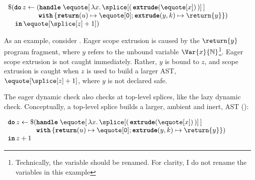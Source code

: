 \begin{code} 
 \begin{source}
  $\begin{array}{l}
      \$(\textbf{\texttt{do}} \, z \leftarrow (\textbf{\texttt{handle}} \; \equote[{\, \lambda x. \,\splice[({{\, \textbf{\texttt{extrude}}(\equote[x]) \,}})]\,}] \\
      \quad\quad\quad\quad\,\; \textbf{\texttt{with}} \, \{ \textbf{\texttt{return}}(u) \mapsto {\equote[\texttt{0}]}; \textbf{\texttt{extrude}}(y, k) \mapsto {\return{y}}\})\\
      \quad \textbf{\texttt{in}} \, \equote[{\splice[z] + 1}])
    \end{array}$
 \end{source}
 \label{listing:eager-scope-extrusion-check-eg}
\end{code}

As an example, consider . Eager scope extrusion is caused by the $\return{y}$ program fragment, where $y$ refers to the unbound variable $\Var{x}{\mathbb{N}}$\footnote{Technically, the variable should be renamed. For clarity, I do not rename the variables in this example}. Eager scope extrusion is not caught immediately. Rather, $y$ is bound to $z$, and scope extrusion is caught when $z$ is used to build a larger AST, $\equote[{\splice[z]+1}]$, where $y$ is not declared safe. 

The eager dynamic check also checks at top-level splices, like the lazy dynamic check. Conceptually, a top-level splice builds a larger, ambient and inert, AST ():

\begin{code} 
 \begin{source}
  $\begin{array}{l}
      \textbf{\texttt{do}} \, z \leftarrow \$(\textbf{\texttt{handle}} \; \equote[{\, \lambda x. \,\splice[(\,{{ \textbf{\texttt{extrude}}(\equote[x])}}\,)] \,}] \\
      \quad\quad\quad\quad\,\textbf{\texttt{with}} \, \{ \textbf{\texttt{return}}(u) \mapsto {\equote[\texttt{0}]}; \textbf{\texttt{extrude}}(y, k) \mapsto {\return{y}}\})\\
      \textbf{\texttt{in}} \, z + 1
    \end{array}$
 \end{source}
 \label{listing:eager-scope-extrusion-check-eg-tls}
\end{code}

